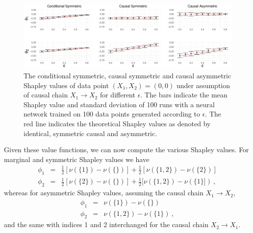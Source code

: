 \documentclass{article}
\begin{document}
\begin{figure}[t]
	\centering
	\includegraphics[width=\textwidth]{figures/XOR_plot.pdf}
	\caption{The conditional symmetric, causal symmetric and causal asymmetric Shapley values of data point $(X_1,X_2) = (0,0)$ under assumption of causal chain $X_1 \rightarrow X_2$ for different $\epsilon$. The bars indicate the mean Shapley value and standard deviation of 100 runs with a neural network trained on 100 data points generated according to $\epsilon$. The red line indicates the theoretical Shapley values as denoted by identical, symmetric causal and asymmetric.
	}
	\label{fig:xor_plot}
\end{figure}


Given these value functions, we can now compute the various Shapley values. For marginal and symmetric Shapley values we have
\begin{eqnarray}
\phi_1 & = & \frac{1}{2}[\nu(\{1\}) - \nu(\{\})] + \frac{1}{2}[\nu(\{1,2\}) - \nu(\{2\})] \nonumber \\
\phi_2 & = & \frac{1}{2}[\nu(\{2\}) - \nu(\{\})] + \frac{1}{2}[\nu(\{1,2\}) - \nu(\{1\}]) \: , \nonumber
\end{eqnarray}
whereas for asymmetric Shapley values, assuming the causal chain $X_1 \rightarrow X_2$,
\begin{eqnarray}
\phi_1 & = & \nu(\{1\}) - \nu(\{\}) \nonumber \\
\phi_2 & = & \nu(\{1,2\}) - \nu(\{1\}) \: , \nonumber
\end{eqnarray}
and the same with indices 1 and 2 interchanged for the causal chain $X_2 \rightarrow X_1$.
\end{document}
